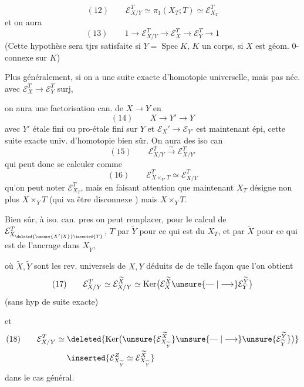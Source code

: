 \[
(12)\qquad \mathcal E_{X/Y}^T\simeq\pi_1(X_T;T)\simeq\mathcal E_{X_T}^T
\]
et on aura
\[
(13)\qquad 1\longrightarrow\mathcal E_{X/Y}^T\longrightarrow\mathcal E_X^T\longrightarrow\mathcal E_Y^T\longrightarrow1
\]
(Cette hypothèse sera tjrs satisfaite si $Y=\operatorname{Spec}K$, $K$ un corps, si $X$ est géom. $0$-connexe sur $K$)

Plus généralement, si on a une suite exacte d'homotopie universelle, mais pas néc. avec $\mathcal E_X^T\longrightarrow\mathcal E_Y^T$ surj,




on aura une factorisation can. de $X\longrightarrow Y$ en
\[
(14)\qquad X\longrightarrow Y'\longrightarrow Y
\]
avec $Y'$ étale fini ou pro-étale fini sur $Y$ et $\mathcal E_X'\longrightarrow\mathcal E_{Y'}$ est maintenant épi,  cette suite exacte univ. d'homotopie bien sûr. On aura des iso can
\[
(15)\qquad \mathcal E_{X/Y}^T\xrightarrow{\sim}\mathcal E_{X/Y'}^T
\]
qui peut donc se calculer comme
\[
(16)\qquad \mathcal E_{X\times_{Y'}T}^T\simeq\mathcal E_{X/Y}^T
\]
qu'on peut noter $\mathcal E_{X_T}^T$, mais en faisant attention que maintenant $X_T$ désigne non plus $X\times_YT$ (qui va être disconnexe ) mais $X\times_YT$.

Bien sûr, à iso. can. pres on peut  remplacer, pour le calcul de $\mathcal E_{X_{\deleted{\unsure{X'|X}}\inserted{T}}}^T$, $T$ par $\widetilde Y$ pour ce qui est du $X_T$, et par $\widetilde X$ pour ce qui est de l'ancrage dans $X_{\widetilde Y}$,



où $\widetilde X,\widetilde Y$ sont les rev. universels de $X,Y$ déduits de  de telle façon que l'on obtient
\[
(17)\qquad \mathcal E_{X/Y}^T\simeq\mathcal E_{X/Y}^{\widetilde X}\simeq\operatorname{Ker}\bigl(\mathcal E_X^{\widetilde X}\unsure{\mathrel{\text{---}}|\longrightarrow}\mathcal E_Y^{\widetilde Y}\bigr)
\]
(sans hyp de suite exacte)

et
\[
\begin{aligned}
(18)\qquad \mathcal E_{X/Y}^T\simeq{}&\deleted{\operatorname{Ker}\bigl(\unsure{\mathcal E_{X_{\widetilde Y}}^{\widetilde X}}\unsure{\mathrel{\text{---}}|\longrightarrow}\unsure{\mathcal E_{\widetilde Y}^{\widetilde Y}}\bigr)}\\
&\inserted{\mathcal E_{X_{\widetilde Y}}^Z\simeq\mathcal E_{X_{\widetilde Y}}^{\widetilde X}}
\end{aligned}
\]
dans le cas général.

